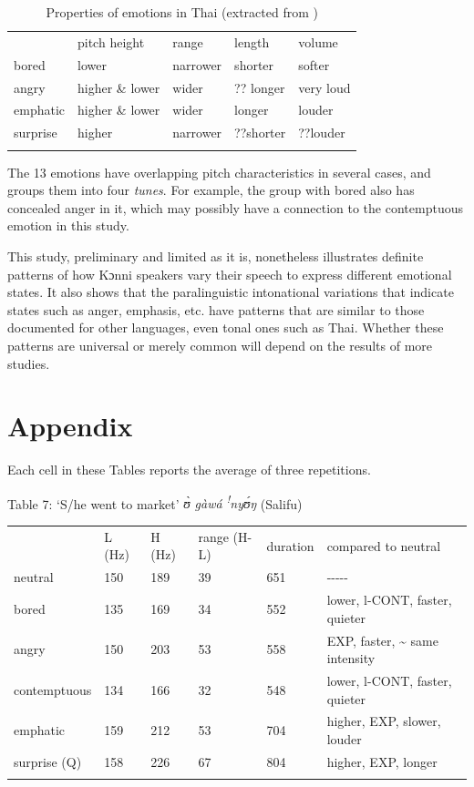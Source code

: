 \documentclass[output=paper]{langsci/langscibook}
\begin{document}
\begin{table}
\begin{tabular}{lllll} & pitch height & range & length & volume\\
\lsptoprule
bored & lower & narrower & shorter & softer\\
angry & higher \& lower & wider & ?? longer & very loud\\
emphatic & higher \& lower & wider & longer & louder\\
surprise & higher & narrower & ??shorter & ??louder\\
\lspbottomrule
\end{tabular}

\caption{Properties of emotions in Thai (extracted from \citealt[382]{luksaneeyanawin1998})}
\label{tab:6.cahill}

\end{table}



The 13 emotions have overlapping pitch characteristics in several cases, and \citeauthor{luksaneeyanawin1998} groups them into four \emph{tunes}. For example, the group with bored also has concealed anger in it, which may possibly have a connection to the contemptuous emotion in this study.

This study, preliminary and limited as it is, nonetheless illustrates definite patterns of how Kɔnni speakers vary their speech to express different emotional states. It also shows that the paralinguistic intonational variations that indicate states such as anger, emphasis, etc. have patterns that are similar to those documented for other languages, even tonal ones such as Thai. Whether these patterns are universal or merely common will depend on the results of more studies.


\section*{Appendix}

Each cell in these Tables reports the average of three repetitions.


Table 7: ‘S/he went to market'	 \emph{ʊ̀ gàwá \textsuperscript{!}nyʊ́ŋ} (Salifu)

\begin{tabular}{llllll} & L (Hz) & H (Hz) & range (H-L) & duration & compared to neutral\\
\lsptoprule
neutral & 150 & 189 & 39 & 651 & {}-{}-{}-{}-{}-\\
bored & 135 & 169 & 34 & 552 & lower, l-CONT, faster, quieter\\
angry & 150 & 203 & 53 & 558 & EXP, faster, \~{} same intensity\\
contemptuous & 134 & 166 & 32 & 548 & lower, l-CONT, faster, quieter\\
emphatic & 159 & 212 & 53 & 704 & higher, EXP, slower, louder\\
surprise (Q) & 158 & 226 & 67 & 804 & higher, EXP, longer\\
\lspbottomrule
\end{tabular}
\end{document}
